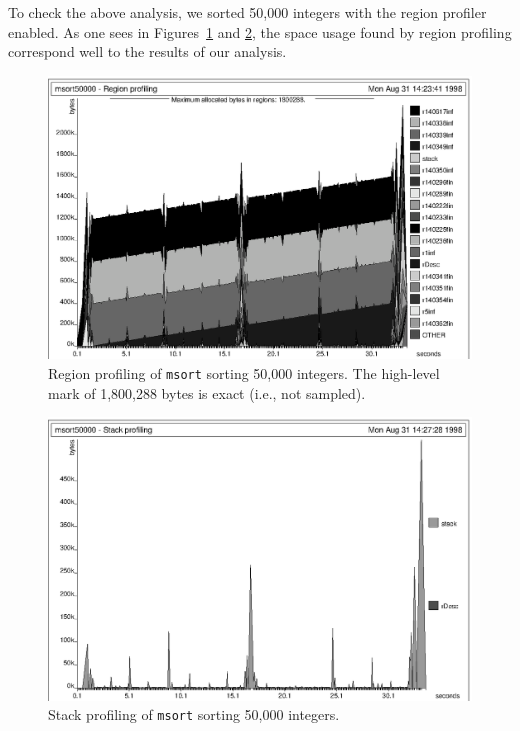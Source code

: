 \documentclass[12pt]{book}
\begin{document}
To check the above analysis, we sorted 50,000 integers with the region
profiler enabled.  As one sees in Figures~\ref{msortregion.fig} and
\ref{msortstack.fig}, the space usage found by region profiling
correspond well to the results of our analysis.
\begin{figure}%
\begin{center}
\includegraphics{msortregion.ps}
\end{center}
\caption{Region profiling of {\tt msort} sorting 50,000
integers. The high-level mark of 1,800,288 bytes is exact (i.e., not sampled).}
\label{msortregion.fig}
\end{figure}

\begin{figure}%
\begin{center}
\includegraphics{msortstack.ps}
\end{center}
\caption{Stack profiling of {\tt msort} sorting 50,000
integers.}
\label{msortstack.fig}
\end{figure}
\end{document}

